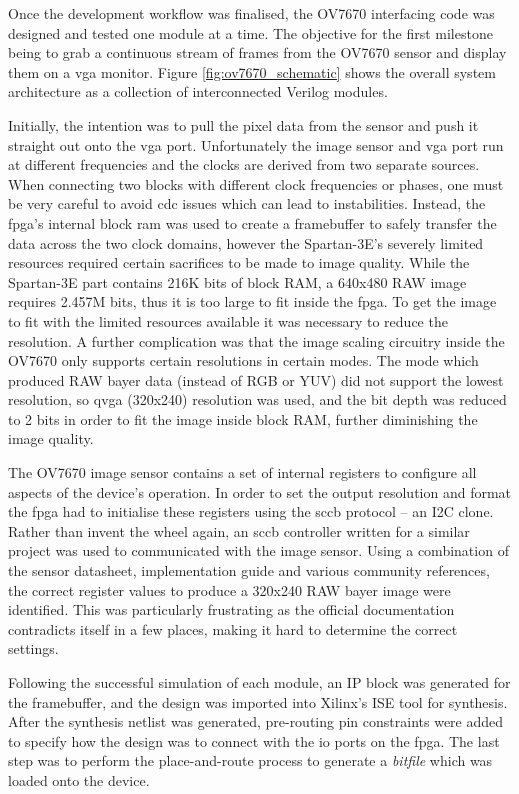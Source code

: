 \documentclass[a4paper]{report}
\begin{document}
Once the development workflow was finalised, the OV7670 interfacing code was designed and tested one module at a time. The objective for the first milestone being to grab a continuous stream of frames from the OV7670 sensor and display them on a \gls{vga} monitor. Figure \ref{fig:ov7670_schematic} shows the overall system architecture as a collection of interconnected Verilog modules.

Initially, the intention was to pull the pixel data from the sensor and push it straight out onto the \gls{vga} port. Unfortunately the image sensor and \gls{vga} port run at different frequencies and the clocks are derived from two separate sources. When connecting two blocks with different clock frequencies or phases, one must be very careful to avoid \gls{cdc} issues which can lead to instabilities. Instead, the \gls{fpga}'s internal block \gls{ram} was used to create a framebuffer to safely transfer the data across the two clock domains, however the Spartan-3E's severely limited resources required certain sacrifices to be made to image quality. While the Spartan-3E part contains 216K bits of block RAM, a 640x480 RAW image requires 2.457M bits, thus it is too large to fit inside the \gls{fpga}. To get the image to fit with the limited resources available it was necessary to reduce the resolution. A further complication was that the image scaling circuitry inside the OV7670 only supports certain resolutions in certain modes. The mode which produced RAW bayer data (instead of RGB or YUV) did not support the lowest resolution, so \gls{qvga} (320x240) resolution was used, and the bit depth was reduced to 2 bits in order to fit the image inside block RAM, further diminishing the image quality.

The OV7670 image sensor contains a set of internal registers to configure all aspects of the device's operation. In order to set the output resolution and format the \gls{fpga} had to initialise these registers using the \gls{sccb} protocol -- an I2C clone. Rather than invent the wheel again, an \gls{sccb} controller written for a similar project was used to communicated with the image sensor. Using a combination of the sensor datasheet, implementation guide and various community references, the correct register values to produce a 320x240 RAW bayer image were identified. This was particularly frustrating as the official documentation contradicts itself in a few places, making it hard to determine the correct settings.

Following the successful simulation of each module, an IP block was generated for the framebuffer, and the design was imported into Xilinx's ISE tool for synthesis. After the synthesis netlist was generated, pre-routing pin constraints were added to specify how the design was to connect with the \gls{io} ports on the \gls{fpga}. The last step was to perform the place-and-route process to generate a \textit{bitfile} which was loaded onto the device.
\end{document}
